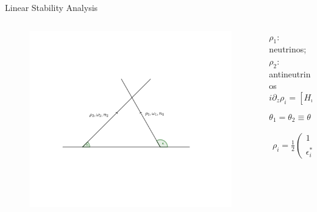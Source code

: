 \documentclass[9pt]{beamer}
\begin{document}
\begin{darkframes}
\begin{frame}{Linear Stability Analysis}
\begin{columns}[T]
      \begin{column}{0.45\textwidth}
      \begin{figure}
         \includegraphics[width=\textwidth]{assets/two-beams-model}
      \end{figure}
      \end{column}

\begin{column}{0.55\textwidth}

$\rho_1$: neutrinos; $\rho_2$: antineutrinos
   \begin{equation*}
   i \partial_z \rho_i = \left[ H_i, \rho_i \right]
   \end{equation*}

   \begin{equation*}
   \theta_1 = \theta_2 \equiv \theta \equiv \pi/6
   \end{equation*}

\pause

   \begin{align*}
      \rho_i = \frac{1}{2}\begin{pmatrix}
      1 & \epsilon_i\\
      \epsilon_i^* & -1
      \end{pmatrix}
   \end{align*}

\pause


\end{column}
\end{columns}
\end{frame}
\end{darkframes}
\end{document}
